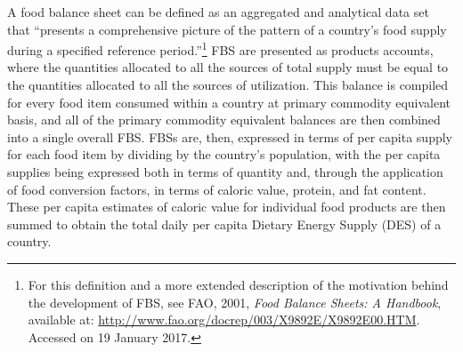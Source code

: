 \documentclass[]{article}
\let\rmarkdownfootnote\footnote%
\def\footnote{\protect\rmarkdownfootnote}
\begin{document}
A food balance sheet can be defined as an aggregated and analytical data
set that ``presents a comprehensive picture of the pattern of a
country's food supply during a specified reference period.''\footnote{For
  this definition and a more extended description of the motivation
  behind the development of FBS, see FAO, 2001, \emph{Food Balance
  Sheets: A Handbook}, available at:
  \url{http://www.fao.org/docrep/003/X9892E/X9892E00.HTM}. Accessed on
  19 January 2017.} FBS are presented as products accounts, where the
quantities allocated to all the sources of total supply must be equal to
the quantities allocated to all the sources of utilization. This balance
is compiled for every food item consumed within a country at primary
commodity equivalent basis, and all of the primary commodity equivalent
balances are then combined into a single overall FBS. FBSs are, then,
expressed in terms of per capita supply for each food item by dividing
by the country's population, with the per capita supplies being
expressed both in terms of quantity and, through the application of food
conversion factors, in terms of caloric value, protein, and fat content.
These per capita estimates of caloric value for individual food products
are then summed to obtain the total daily per capita Dietary Energy
Supply (DES) of a country.
\end{document}
